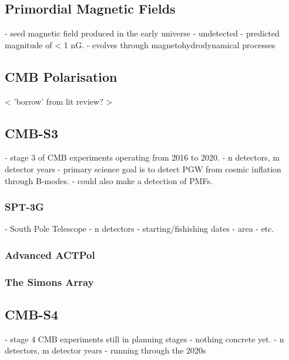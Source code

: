 \subsection{Primordial Magnetic Fields}
	- seed magnetic field produced in the early universe
	- undetected
	- predicted magnitude of < 1 nG.
	- evolves through magnetohydrodynamical processes

\subsection{CMB Polarisation}
	< 'borrow' from lit review? >
	
\subsection{CMB-S3}
	- stage 3 of CMB experiments operating from 2016 to 2020.
	- n detectors, m detector years
	- primary science goal is to detect PGW from cosmic inflation through B-modes.
	- could also make a detection of PMFs.
\subsubsection{SPT-3G}
	- South Pole Telescope
	- n detectors
	- starting/fishishing dates
	- area
	- etc.
\subsubsection{Advanced ACTPol}
\subsubsection{The Simons Array}
\subsection{CMB-S4}
	- stage 4 CMB experiments still in planning stages - nothing concrete yet.
	- n detectors, m detector years
	- running through the 2020s